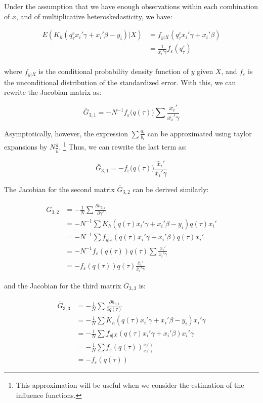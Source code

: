 \documentclass[
  authoryear,
  review,
  1p]{elsarticle}
\begin{document}
Under the assumption that we have enough observations within each
combination of \(x\), and of multiplicative heteroskedasticity, we have:

\[\begin{aligned}
E(K_h(q^\varepsilon_\tau x_i'\gamma +x_i'\beta - y_i )|X) &= f_{y|X}(q^\varepsilon_\tau x_i'\gamma +x_i'\beta) \\
&=\frac{1}{x_i'\gamma} f_{\varepsilon}(q^\varepsilon_\tau) \\
\end{aligned}
\]

where \(f_{y|X}\) is the conditional probability density function of
\(y\) given \(X\), and \(f_\varepsilon\) is the unconditional
distribution of the standardized error. With this, we can rewrite the
Jacobian matrix as:

\[\bar G_{3,1} = -N^{-1} f_{\varepsilon}\big(q(\tau)\big) \sum  \frac{x_i'}{x_i'\gamma} 
\]

Asymptotically, however, the expression \(\sum\frac{a_i}{b_i}\) can be
approximated using taylor expansions by \(N\frac{\bar a}{\bar b}\).
\footnote{This approximation will be useful when we consider the
  estimation of the influence functions.} Thus, we can rewrite the last
term as:

\[\bar G_{3,1} = - f_{\varepsilon}\big(q(\tau)) \frac{\bar x_i'}{\bar x_i'\gamma} 
\]

The Jacobian for the second matrix \(\bar G_{3,2}\) can be derived
similarly:

\[\begin{aligned}
\bar G_{3,2} &= -\frac{1}{N} \sum \frac{\partial h_{3,i}}{\partial \gamma'} \\
             &= -N^{-1} \sum K_h(q(\tau) x_i'\gamma +x_i'\beta - y_i ) q(\tau) x_i' \\
             &=-N^{-1} \sum f_{y|x}(q(\tau) x_i'\gamma +x_i'\beta ) q(\tau) x_i' \\
             &=-N^{-1} f_{\varepsilon}(q(\tau)) q(\tau) \sum \frac{x_i'}{x_i'\gamma} \\
             &=- f_{\varepsilon}(q(\tau)) q(\tau) \frac{\bar x_i'}{\bar x_i'\gamma}
\end{aligned}
\]

and the Jacobian for the third matrix \(\bar G_{3,3}\) is:

\[\begin{aligned}
\bar G_{3,3} &= -\frac{1}{N} \sum \frac{\partial h_{3,i}}{\partial q(\tau)} \\
 &= -\frac{1}{N} \sum K_h(q(\tau) x_i'\gamma +x_i'\beta - y_i ) x_i'\gamma \\
 &= -\frac{1}{N} \sum f_{y|X}(q(\tau) x_i'\gamma +x_i'\beta) x_i'\gamma \\
 &= -\frac{1}{N} \sum f_{\varepsilon}(q(\tau)) \frac{x_i'\gamma}{ x_i'\gamma} \\
 &= - f_{\varepsilon}(q(\tau)) 
\end{aligned}
\]
\end{document}
